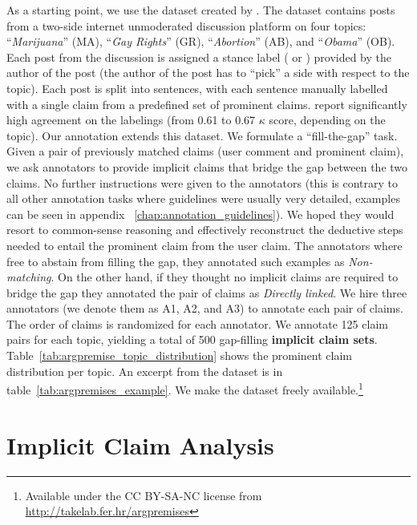 As a starting point, we use the dataset created by
\citet{hasan2014you}. 
The dataset contains posts from a two-side internet unmoderated discussion platform 
on four topics: ``\emph{Marijuana}'' (MA), ``\emph{Gay Rights}'' (GR), 
``\emph{Abortion}'' (AB), and ``\emph{Obama}'' (OB).
Each post from the discussion is assigned a stance label ( or ) 
provided by the author of the post (the author of the post has to ``pick'' a side 
with respect to the topic). 
Each post is split into sentences, with each sentence manually
labelled with a single claim from a predefined set of prominent
claims. 
\citet{hasan2014you} report significantly high agreement on the labelings
(from 0.61 to 0.67 $\kappa$ score, depending on the topic). 
Our annotation extends this dataset. 
We formulate a ``fill-the-gap'' task. 
Given a pair of previously matched claims (user comment and 
prominent claim), we ask annotators to provide implicit claims that bridge the gap 
between the two claims. 
No further instructions were given to the annotators (this is contrary to all other
annotation tasks where guidelines were usually very detailed, examples can be seen in appendix
~\ref{chap:annotation_guidelines}). 
We hoped they would resort to common-sense reasoning and effectively 
reconstruct the deductive steps needed to entail the prominent claim from the user
claim.
The annotators where free to abstain from filling the gap, they
annotated such examples as \emph{Non-matching}. 
On the other hand, if they thought no implicit claims are required
to bridge the gap they annotated the pair of claims as \emph{Directly linked}. 
We hire three annotators (we denote them as A1, A2, and A3) to annotate each pair of claims. 
The order of claims is randomized for each annotator. 
We annotate 125 claim pairs for each topic, yielding a total of 500 gap-filling
\textbf{implicit claim sets}. 
Table~\ref{tab:argpremise_topic_distribution} shows the prominent claim distribution per topic. 
An excerpt from the dataset is in table~\ref{tab:argpremises_example}. 
We make the dataset freely available.\footnote{Available under the CC BY-SA-NC license from
\url{http://takelab.fer.hr/argpremises}}

\section{Implicit Claim Analysis}
\label{sec:argpremise_analysis}

